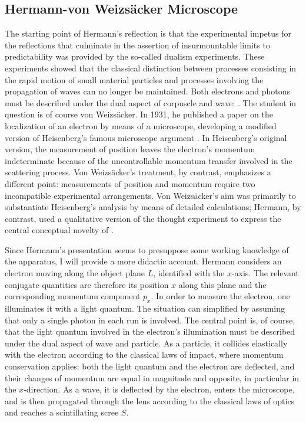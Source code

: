 \documentclass[final,12pt]{article}
\newcommand{\TE}{thought experiment\xspace}
\newcommand{\vW}{von Weizsäcker\xspace}
\newcommand{\VW}{Von Weizsäcker\xspace}
\newcommand{\NGQ}[2]{\autocite[#1/#2]{Hermann1935}}
\newcommand{\pos}{\ensuremath{x}\xspace}
\newcommand{\mom}{\ensuremath{p_x}\xspace}
\begin{document}
\subsection{Hermann-\vW Microscope}
%
The starting point of Hermann's reflection is that the experimental impetus for the reflections that culminate in the assertion of insurmountable limits to predictability was provided by the so-called dualism experiments. These experiments showed that the classical distinction between processes consisting in the rapid motion of small material particles and processes involving the propagation of waves can no longer be maintained. Both electrons and photons must be described under the dual aspect of corpuscle and wave:  \NGQ{110\psq}{257}. The student in question is of course \vW. In 1931, he published a paper on the localization of an electron by means of a microscope, developing a modified version of Heisenberg's famous microscope argument \citep{Weizsacker1931}. In Heisenberg's original version, the measurement of position leaves the electron's momentum indeterminate because of the uncontrollable momentum transfer involved in the scattering process. \VW's treatment, by contrast,  emphasizes a different point: measurements of position and momentum require two incompatible experimental arrangements. \VW's aim was primarily to substantiate Heisenberg's analysis by means of detailed calculations; Hermann, by contrast, used a qualitative version of the \TE to express the central conceptual novelty of \qm \citep{Filk2016}. 

Since Hermann's presentation seems to presuppose some working knowledge of the apparatus, I will provide a more didactic account. Hermann considers an electron moving along the object plane $L$, identified with the $x$-axis. The relevant conjugate quantities are therefore its position \pos along this plane and the corresponding momentum component \mom. In order to measure the electron, one illuminates it with a light quantum. The situation can simplified by assuming that only a single photon in each run is involved. The central point is, of course, that the light quantum involved in the electron's illumination must be described under the dual aspect of wave and particle. As a particle, it collides elastically with the electron according to the classical laws of impact, where momentum conservation applies: both the light quantum and the electron are deflected, and their changes of momentum are equal in magnitude and opposite, in particular in the $x$-direction. As a wave, it is deflected by the electron, enters the microscope, and is then propagated through the lens according to the classical laws of optics and reaches a scintillating scree $S$. 
\end{document}
